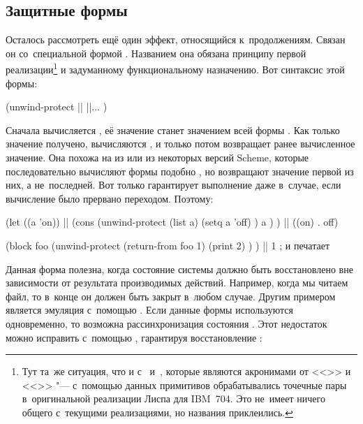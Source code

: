 \subsection{Защитные формы}\label{escape/forms/ssect:protection}

Осталось рассмотреть ещё один эффект, относящийся к~продолжениям. Связан он
со~специальной формой . Названием она обязана принципу первой
реализации\footnote{Тут та~же ситуация, что и с~ и~, которые
являются акронимами от <<>> и
<<>> "--- с~помощью данных
примитивов обрабатывались точечные пары в~оригинальной реализации Лиспа для
IBM~704. Это не~имеет ничего общего с~текущими реализациями, но названия
приклеились.} и задуманному функциональному назначению. Вот синтаксис этой
формы:

\begin{code:lisp}
(unwind-protect ||
  ||... )
\end{code:lisp}

Сначала вычисляется , её значение станет значением всей формы
. Как только значение  получено, вычисляются
, и только потом  возвращает ранее
вычисленное значение. Она похожа на  из {\CommonLisp} или 
из некоторых версий Scheme, которые последовательно вычисляют формы подобно
, но возвращают значение первой из них, а не~последней. Вот только
 гарантирует выполнение  даже в~случае, если
вычисление  было прервано переходом. Поэтому:

\begin{code:lisp}
(let ((a 'on))          |\dialect{\CommonLisp}|
  (cons (unwind-protect (list a)
          (setq a 'off) )
        a ) ) |\is| ((on) . off)

(block foo
  (unwind-protect (return-from foo 1)
    (print 2) ) ) |\is| 1 ; и печатает 
\end{code:lisp}

Данная форма полезна, когда состояние системы должно быть восстановлено вне
зависимости от результата производимых действий. Например, когда мы читаем файл,
то в~конце он должен быть закрыт в~любом случае. Другим примером является
эмуляция  с~помощью . Если данные формы используются
одновременно, то возможна рассинхронизация состояния .
Этот недостаток можно исправить с~помощью , гарантируя
восстановление :

